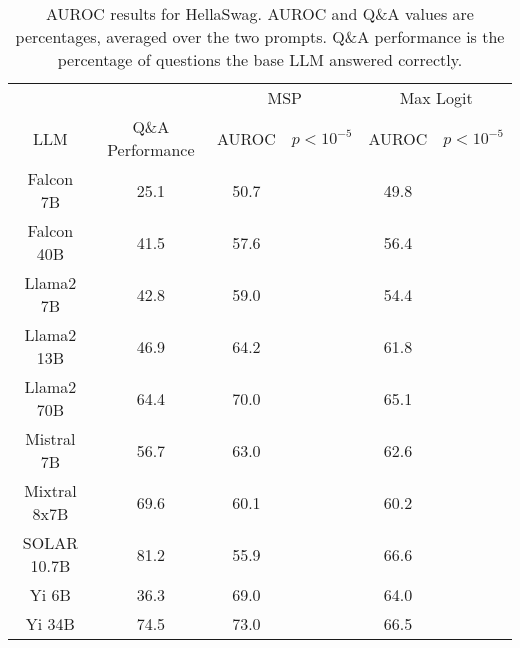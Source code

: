 \begin{table*}
\centering
\begin{tabular}{c|c|c|c|c|c}
& & \multicolumn{2}{c|}{MSP} & \multicolumn{2}{c}{Max Logit} \\ 
LLM & Q\&A Performance & AUROC & $p < 10^{-5}$ & AUROC & $p < 10^{-5}$\\ \hline
Falcon 7B & 25.1 & 50.7 &  & 49.8 & \\
Falcon 40B & 41.5 & 57.6 &  & 56.4 & \\
Llama2 7B & 42.8 & 59.0 &  & 54.4 & \\
Llama2 13B & 46.9 & 64.2 &  & 61.8 & \\
Llama2 70B & 64.4 & 70.0 &  & 65.1 & \\
Mistral 7B & 56.7 & 63.0 &  & 62.6 & \\
Mixtral 8x7B & 69.6 & 60.1 &  & 60.2 & \\
SOLAR 10.7B & 81.2 & 55.9 &  & 66.6 & \\
Yi 6B & 36.3 & 69.0 &  & 64.0 & \\
Yi 34B & 74.5 & 73.0 &  & 66.5 & \\
\hline
\end{tabular}
\caption{AUROC results for HellaSwag. AUROC and Q\&A values are percentages, averaged over the two prompts. Q\&A performance is the percentage of questions the base LLM answered correctly.}
\label{tab:hellaswag_auroc}
\end{table*}
